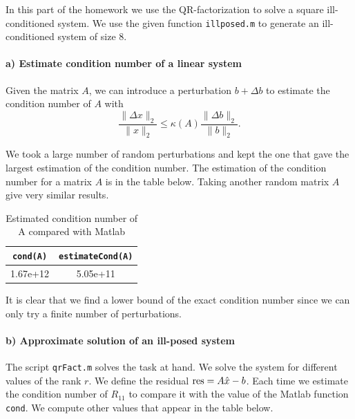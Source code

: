 


In this part of the homework we use the QR-factorization to solve a square ill-conditioned system. We use the given function \texttt{illposed.m} to generate an ill-conditioned system of size 8. 

\paragraph*{a) Estimate condition number of a linear system}

Given the matrix $A$, we can introduce a perturbation $b+\Delta b$ to estimate the condition number of $A$ with 
$$\dfrac{\parallel \Delta x \parallel_2}{\parallel x \parallel_2}\leq\kappa (A)\dfrac{\parallel \Delta b \parallel_2}{\parallel b \parallel_2}.$$

We took a large number of random perturbations and kept the one that gave the largest estimation of the condition number. The estimation of the condition number for a matrix $A$ is in the table below. Taking another random matrix $A$ give very similar results. 

\begin{table}[hb]
\centering
\begin{tabu}{|c|c|}
\hline 
\texttt{cond(A)} & \texttt{estimateCond(A)} \\ 
\hline 
1.67e+12 & 5.05e+11 \\ 
\hline 
\end{tabu}
\caption{Estimated condition number of A compared with Matlab}
\end{table} 
It is clear that we find a lower bound of the exact condition number since we can only try a finite number of perturbations.


\paragraph*{b) Approximate solution of an ill-posed system}

The script \texttt{qrFact.m} solves the task at hand. We solve the system for different values of the rank $r$. We define the residual $\text{res} = A\hat{x}-b$. Each time we estimate the condition number of $R_{11}$ to compare it with the value of the Matlab function \texttt{cond}. We compute other values that appear in the table below.

